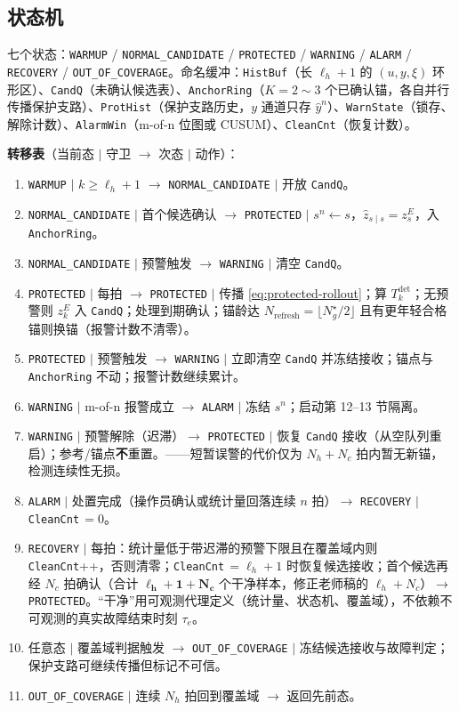 \documentclass[11pt,a4paper]{ctexart}
\theoremstyle{remark}
\begin{document}
\subsection{状态机}

七个状态：\texttt{WARMUP} / \texttt{NORMAL\_CANDIDATE} / \texttt{PROTECTED} / \texttt{WARNING} / \texttt{ALARM} / \texttt{RECOVERY} / \texttt{OUT\_OF\_COVERAGE}。命名缓冲：\texttt{HistBuf}（长 $\ell_h{+}1$ 的 $(u,y,\xi)$ 环形区）、\texttt{CandQ}（未确认候选表）、\texttt{AnchorRing}（$K{=}2\sim3$ 个已确认锚，各自并行传播保护支路）、\texttt{ProtHist}（保护支路历史，$y$ 通道只存 $\hat y^n$）、\texttt{WarnState}（锁存、解除计数）、\texttt{AlarmWin}（m-of-n 位图或 CUSUM）、\texttt{CleanCnt}（恢复计数）。

\textbf{转移表}（当前态 $\mid$ 守卫 $\to$ 次态 $\mid$ 动作）：

\begin{enumerate}[label=T\arabic*]
\item \texttt{WARMUP} $\mid$ $k\ge\ell_h+1$ $\to$ \texttt{NORMAL\_CANDIDATE} $\mid$ 开放 \texttt{CandQ}。
\item \texttt{NORMAL\_CANDIDATE} $\mid$ 首个候选确认 $\to$ \texttt{PROTECTED} $\mid$ $s^n\leftarrow s$，$\hat z_{s\mid s}=z^E_s$，入 \texttt{AnchorRing}。
\item \texttt{NORMAL\_CANDIDATE} $\mid$ 预警触发 $\to$ \texttt{WARNING} $\mid$ 清空 \texttt{CandQ}。
\item \texttt{PROTECTED} $\mid$ 每拍 $\to$ \texttt{PROTECTED} $\mid$ 传播 \eqref{eq:protected-rollout}；算 $T^{\mathrm{det}}_k$；无预警则 $z^E_k$ 入 \texttt{CandQ}；处理到期确认；锚龄达 $N_{\mathrm{refresh}}=\lfloor N^\star_g/2\rfloor$ 且有更年轻合格锚则换锚（报警计数不清零）。
\item \texttt{PROTECTED} $\mid$ 预警触发 $\to$ \texttt{WARNING} $\mid$ 立即清空 \texttt{CandQ} 并冻结接收；锚点与 \texttt{AnchorRing} 不动；报警计数继续累计。
\item \texttt{WARNING} $\mid$ m-of-n 报警成立 $\to$ \texttt{ALARM} $\mid$ 冻结 $s^n$；启动第 12--13 节隔离。
\item \texttt{WARNING} $\mid$ 预警解除（迟滞）$\to$ \texttt{PROTECTED} $\mid$ 恢复 \texttt{CandQ} 接收（从空队列重启）；参考/锚点\textbf{不}重置。——短暂误警的代价仅为 $N_h+N_c$ 拍内暂无新锚，检测连续性无损。
\item \texttt{ALARM} $\mid$ 处置完成（操作员确认或统计量回落连续 $n$ 拍）$\to$ \texttt{RECOVERY} $\mid$ \texttt{CleanCnt}$\,=0$。
\item \texttt{RECOVERY} $\mid$ 每拍：统计量低于带迟滞的预警下限且在覆盖域内则 \texttt{CleanCnt}++，否则清零；\texttt{CleanCnt}$\,=\ell_h+1$ 时恢复候选接收；首个候选再经 $N_c$ 拍确认（合计 $\bm{\ell_h+1+N_c}$ 个干净样本，修正老师稿的 $\ell_h+N_c$）$\to$ \texttt{PROTECTED}。“干净”用可观测代理定义（统计量、状态机、覆盖域），不依赖不可观测的真实故障结束时刻 $\tau_e$。
\item 任意态 $\mid$ 覆盖域判据触发 $\to$ \texttt{OUT\_OF\_COVERAGE} $\mid$ 冻结候选接收与故障判定；保护支路可继续传播但标记不可信。
\item \texttt{OUT\_OF\_COVERAGE} $\mid$ 连续 $N_h$ 拍回到覆盖域 $\to$ 返回先前态。
\end{enumerate}
\end{document}
